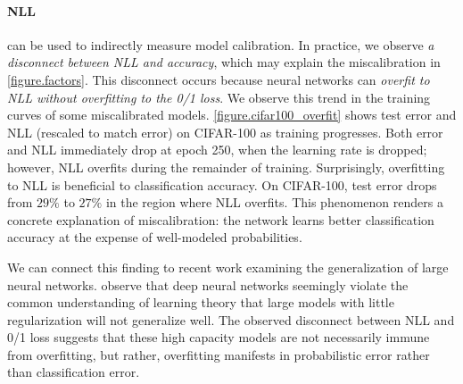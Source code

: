 \paragraph{NLL} can be used to indirectly measure model calibration. In practice, we observe \emph{a disconnect between NLL and accuracy}, which may explain the miscalibration in \autoref{figure.factors}.
%
This disconnect occurs because neural networks can \emph{overfit to NLL without overfitting to the 0/1 loss}.
We observe this trend in the training curves of some miscalibrated models.
\autoref{figure.cifar100_overfit} shows test error and NLL (rescaled to match error) on CIFAR-100 as training progresses.
Both error and NLL immediately drop at epoch 250, when the learning rate is dropped; however, NLL overfits during the remainder of training.
Surprisingly, overfitting to NLL is beneficial to classification accuracy. On CIFAR-100, test error drops from $29\%$ to $27\%$ in the region where NLL overfits. This phenomenon renders a concrete explanation of miscalibration: the network learns better classification accuracy at the expense of well-modeled probabilities.

We can connect this finding to recent work examining the generalization of large neural networks. \citet{zhang2016understanding} observe that deep neural networks seemingly violate  the common understanding of learning theory that large models with little regularization will not generalize well. The observed disconnect between NLL and 0/1 loss suggests that these high capacity models are not necessarily immune from overfitting, but rather, overfitting manifests in probabilistic error rather than classification error.
